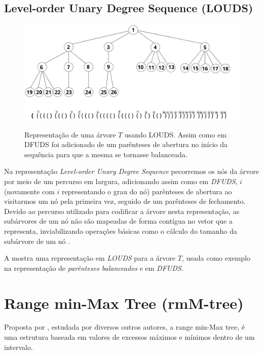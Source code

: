 \subsection{Level-order Unary Degree Sequence (LOUDS)}
\begin{figure}[h!]
    \centering
      \caption[Representação de árvores com Level-order Unary Degree Sequence]{Representação de uma árvore $T$ usando LOUDS. 
      Assim como em DFUDS foi adicionado de um parênteses de abertura no início da sequência  para que a mesma se tornasse balanceada.}
      \includegraphics[width=\columnwidth]{images/louds.png}
      \label{fig:louds-representation}
\end{figure}
Na representação \textit{Level-order Unary Degree Sequence} \citep{article-louds,article-dfuds} pecorremos os nós da árvore por meio de um percurso em largura, adicionando assim como em \textit{DFUDS}, $i$ (novamente com $i$ representando o grau do nó) parênteses de abertura ao visitarmos um nó pela primeira vez, seguido de um parênteses de fechamento.
 Devido ao percurso utilizado para codificar a árvore nesta representação, as subárvores de um nó não são mapeadas de forma contígua no vetor que a representa, inviabilizando operações básicas como o cálculo do tamanho da subárvore de um nó \citep{book-compact-data-structures,paper-fully-functinal-succint-trees}.

A  mostra uma representação em \textit{LOUDS} para a árvore $T$, usada como exemplo na representação de \textit{parênteses balanceados} e em \textit{DFUDS}.

\section{Range min-Max Tree (rmM-tree)}\label{sec:sec-classic-rmm-tree}
Proposta por \citet{paper-fully-functinal-succint-trees}, estudada por diversos outros autores, a range min-Max tree, é uma estrutura baseada em valores de excessos máximos e mínimos dentro de um intervalo. 


